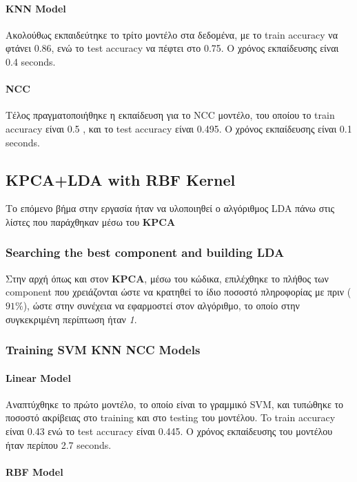 \paragraph{KNN Model}
Ακολούθως εκπαιδεύτηκε το τρίτο μοντέλο στα δεδομένα, με το train accuracy να φτάνει 0.86, ενώ το test accuracy να πέφτει στο 0.75. Ο χρόνος εκπαίδευσης είναι 0.4 seconds.
\paragraph{NCC}
Τέλος πραγματοποιήθηκε η εκπαίδευση για το NCC μοντέλο, του οποίου το train accuracy είναι 0.5 , και το test accuracy είναι 0.495. Ο χρόνος εκπαίδευσης είναι 0.1 seconds.
\subsection{KPCA+LDA with RBF Kernel}

Το επόμενο βήμα στην εργασία ήταν να υλοποιηθεί ο αλγόριθμος LDA πάνω στις λίστες που παράχθηκαν μέσω του \textbf{KPCA}
\subsubsection{Searching the best component  and building LDA  }

Στην αρχή όπως και στον \textbf{KPCA}, μέσω του κώδικα, επιλέχθηκε το πλήθος των component που χρειάζονται ώστε να κρατηθεί το ίδιο ποσοστό πληροφορίας με πριν ($91\%$), ώστε στην συνέχεια να εφαρμοστεί στον αλγόριθμο, το οποίο στην συγκεκριμένη περίπτωση ήταν \emph{1}.

\subsubsection{Training SVM KNN NCC Models}

\paragraph{Linear Model}

Αναπτύχθηκε το πρώτο μοντέλο, το οποίο είναι το γραμμικό SVM, και
τυπώθηκε το ποσοστό ακρίβειας στο training και στο testing του μοντέλου. To train accuracy είναι 0.43 ενώ το test accuracy είναι 0.445. Ο χρόνος εκπαίδευσης του μοντέλου ήταν περίπου 2.7 seconds.

\paragraph{RBF Model}

